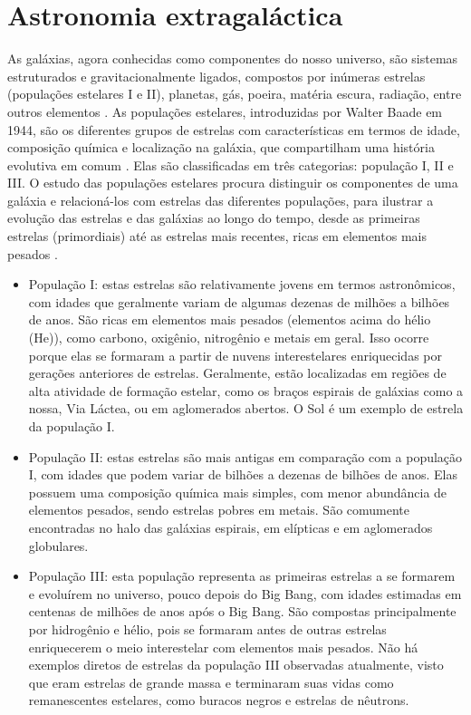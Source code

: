 \section{Astronomia extragaláctica}

As galáxias, agora conhecidas como componentes do nosso universo, são sistemas estruturados e gravitacionalmente ligados, compostos por inúmeras estrelas (populações estelares I e II), planetas, gás, poeira, matéria escura, radiação, entre outros elementos \cite{2018inpe}. As populações estelares, introduzidas por Walter Baade em 1944, são os diferentes grupos de estrelas com características em termos de idade, composição química e localização na galáxia, que compartilham uma história evolutiva em comum \cite{2010arnab}. Elas são classificadas em três categorias: população I, II e III. O estudo das populações estelares procura distinguir os componentes de uma galáxia e relacioná-los com estrelas das diferentes populações, para ilustrar a evolução das estrelas e das galáxias ao longo do tempo, desde as primeiras estrelas (primordiais) até as estrelas mais recentes, ricas em elementos mais pesados \cite{2023Kepler}.

\begin{itemize}
  \item População I: estas estrelas são relativamente jovens em termos astronômicos, com idades que geralmente variam de algumas dezenas de milhões a bilhões de anos. São ricas em elementos mais pesados (elementos acima do hélio (He)), como carbono, oxigênio, nitrogênio e metais em geral. Isso ocorre porque elas se formaram a partir de nuvens interestelares enriquecidas por gerações anteriores de estrelas. Geralmente, estão localizadas em regiões de alta atividade de formação estelar, como os braços espirais de galáxias como a nossa, Via Láctea, ou em aglomerados abertos. O Sol é um exemplo de estrela da população I.
  \item População II: estas estrelas são mais antigas em comparação com a população I, com idades que podem variar de bilhões a dezenas de bilhões de anos. Elas possuem uma composição química mais simples, com menor abundância de elementos pesados, sendo estrelas pobres em metais. São comumente encontradas no halo das galáxias espirais, em elípticas e em aglomerados globulares.
  \item População III: esta população representa as primeiras estrelas a se formarem e evoluírem no universo, pouco depois do Big Bang, com idades estimadas em centenas de milhões de anos após o Big Bang. São compostas principalmente por hidrogênio e hélio, pois se formaram antes de outras estrelas enriquecerem o meio interestelar com elementos mais pesados. Não há exemplos diretos de estrelas da população III observadas atualmente, visto que eram estrelas de grande massa e terminaram suas vidas como remanescentes estelares, como buracos negros e estrelas de nêutrons.
\end{itemize}

